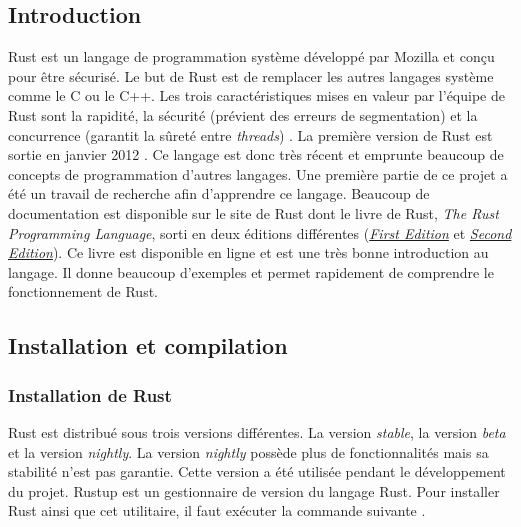 
\subsection{Introduction}
Rust est un langage de programmation système développé par Mozilla et conçu pour
être sécurisé. Le but de Rust est de remplacer les autres langages système comme
le C ou le C++. Les trois caractéristiques mises en valeur par l'équipe de Rust
sont la rapidité, la sécurité (prévient des erreurs de segmentation) et la concurrence
(garantit la sûreté entre \textit{threads}) \cite{ref27}. La première version
de Rust est sortie en janvier 2012 \cite{ref28}. Ce langage est donc très récent
et emprunte beaucoup de concepts de programmation d'autres langages. Une première
partie de ce projet a été un travail de recherche afin d'apprendre ce langage.
Beaucoup de documentation est disponible sur le site de Rust dont le livre
de Rust, \textit{The Rust Programming Language}, sorti en deux éditions différentes
(\href{https://doc.rust-lang.org/book/first-edition}{\textit{First Edition}} et
\href{https://doc.rust-lang.org/book/second-edition}{\textit{Second Edition}}).
Ce livre est disponible en ligne et est une très bonne introduction au langage.
Il donne beaucoup d'exemples et permet rapidement de comprendre le fonctionnement de
Rust.


\subsection{Installation et compilation}
\subsubsection{Installation de Rust}
Rust est distribué sous trois versions différentes. La version \textit{stable},
la version \textit{beta} et la version \textit{nightly}. La version \textit{nightly}
possède plus de fonctionnalités mais sa stabilité n'est pas garantie. Cette version
a été utilisée pendant le développement du projet. Rustup est un gestionnaire de
version du langage Rust. Pour installer Rust ainsi que cet utilitaire, il faut
exécuter la commande suivante \cite{ref2}.

